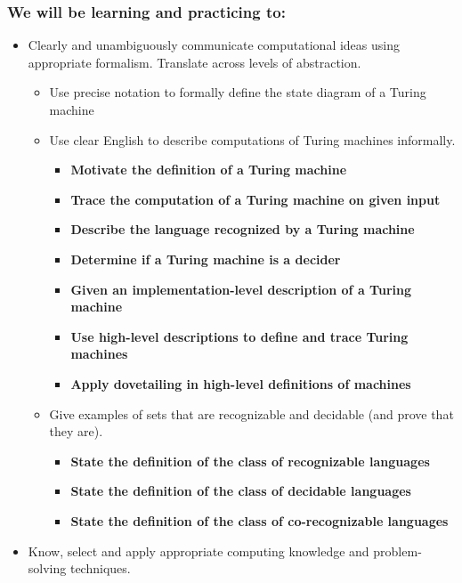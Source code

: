 \subsubsection*{We will be learning and practicing to:}
\vspace{-20pt}

\begin{itemize}
    \item Clearly and unambiguously communicate computational ideas using appropriate formalism. Translate across levels of abstraction.
    \begin{itemize}
        \item Use precise notation to formally define the state diagram of a Turing machine
        \item Use clear English to describe computations of Turing machines informally.
        \begin{itemize}
                \item {\bf Motivate the definition of a Turing machine}
                \item {\bf Trace the computation of a Turing machine on given input}
                \item {\bf Describe the language recognized by a Turing machine}
                \item {\bf Determine if a Turing machine is a decider}
                \item {\bf Given an implementation-level description of a Turing machine}
                \item {\bf Use high-level descriptions to define and trace Turing machines}
                \item {\bf Apply dovetailing in high-level definitions of machines}
         \end{itemize}
       \item Give examples of sets that are recognizable and decidable (and prove that they are).
       \begin{itemize}
          \item {\bf State the definition of the class of recognizable languages}
          \item {\bf State the definition of the class of decidable languages}
          \item {\bf State the definition of the class of co-recognizable languages}
       \end{itemize}
    \end{itemize}
    \item Know, select and apply appropriate computing knowledge and problem-solving techniques. 

\end{itemize}
